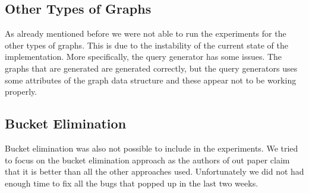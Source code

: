 \subsection{Other Types of Graphs} \label{subsec:ResultsOtherTypes}
As already mentioned before we were not able to run the experiments for the other types of graphs. This is due to the instability of the current state of the implementation. More specifically, the query generator has some issues. The graphs that are generated are generated correctly, but the query generators uses some attributes of the graph data structure and these appear not to be working properly. 

\subsection{Bucket Elimination} \label{subsec:ResultsBucket}
Bucket elimination was also not possible to include in the experiments. We tried to focus on the bucket elimination approach as the authors of out paper \cite{paper} claim that it is better than all the other approaches used. Unfortunately we did not had enough time to fix all the bugs that popped up in the last two weeks. 